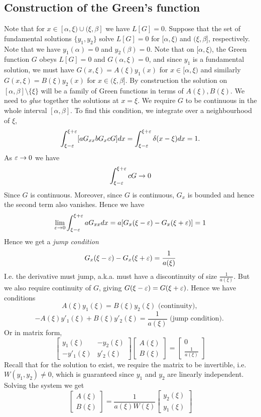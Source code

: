 \subsection{Construction of the Green's function}
Note that for $x\in [\alpha, \xi)\cup (\xi, \beta]$ we have $L[G]=0$.  Suppose that the
set of fundamental solutions $\{y_1,y_2\}$ solve $L[G]=0$ for $[\alpha,\xi)$ and $(\xi,
\beta]$, respectively. Note that we have $y_1(\alpha)=0$ and $y_2(\beta)=0$. Note that on
$[\alpha,\xi)$, the Green function $G$ obeys $L[G]=0$ and $G(\alpha,\xi)=0$, and since
$y_1$ is a fundamental solution, we must have $G(x,\xi)=A(\xi)y_1(x)$ for $x\in[\alpha,
\xi)$ and similarly $G(x,\xi)=B(\xi)y_2(x)$ for $x\in (\xi,\beta]$. By construction the
solution on $[\alpha,\beta]\setminus\{\xi\}$ will be a family of Green functions in terms
of $A(\xi), B(\xi)$. We need to \emph{glue} together the solutions at $x=\xi$. We
require $G$ to be continuous in the whole interval $[\alpha,\beta]$. To find this
condition, we integrate over a neighbourhood of $\xi$, 
\[\int_{\xi-\varepsilon}^{\xi+\varepsilon} [aG_{xx} bG_x cG] dx = \int_{\xi-\varepsilon}^{\xi+\varepsilon}
\delta(x-\xi) dx=1.\]
As $\varepsilon\to 0$ we have
\[ \int_{\xi-\varepsilon}^{\xi+\varepsilon} cG \to 0\]
Since $G$ is continuous.
Moreover, since $G$ is continuous, $G_x$ is bounded and hence the second term also
vanishes. Hence we have 
\[\lim_{\varepsilon\to 0} \int_{\xi-\varepsilon}^{\xi+\varepsilon} aG_{xx} dx =
a[G_x(\xi-\varepsilon)-G_x(\xi+\varepsilon)] =1\]
Hence we get a \emph{jump condition}
\[G_x(\xi-\varepsilon)-G_x(\xi+\varepsilon)=\frac{1}{a(\xi)}\]
I.e. the derivative must jump, a.k.a. must have a discontinuity of size
$\frac{1}{a(\xi)}$. But we also require continuity of $G$, giving
$G(\xi-\varepsilon)=G(\xi+\varepsilon)$. Hence we have conditions
\[A(\xi)y_1(\xi) = B(\xi) y_2(\xi) \text{ (continuity), }\]
\[-A(\xi)y'_1(\xi) + B(\xi) y'_2(\xi) = \frac{1}{a(\xi)} \text{ (jump condition). }\]
Or in matrix form,
\[
  \begin{bmatrix}
    y_1(\xi) & -y_2(\xi) \\
    -y'_1(\xi) & y'_2(\xi) 
  \end{bmatrix}
  \begin{bmatrix}
    A(\xi) \\
    B(\xi) 
  \end{bmatrix}=
  \begin{bmatrix}
    0 \\
    \frac{1}{a(\xi)}
  \end{bmatrix}
\]
Recall that for the solution to exist, we require the matrix to be invertible, i.e.
$W(y_1,y_2)\neq 0$, which is guaranteed since $y_1$ and $y_2$ are linearly
independent. Solving the system we get
\[
  \begin{bmatrix}
    A(\xi) \\
    B(\xi) 
  \end{bmatrix}=
  \frac{1}{a(\xi) W(\xi)}
  \begin{bmatrix}
    y_2(\xi) \\
    y_1(\xi)
  \end{bmatrix}
\]

